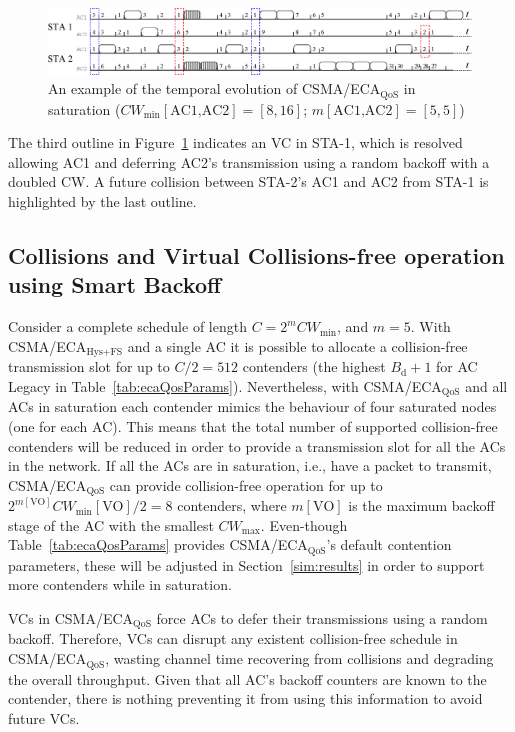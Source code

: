 	\begin{figure}[tb]
	\centering
		\includegraphics[width=0.9\linewidth]{figures/csma-eca-hew-oldScheme-fixed.eps}
		\caption{An example of the temporal evolution of CSMA/ECA$_{\text{QoS}}$ in saturation ($CW_{\min}[\text{AC1,AC2}]=[8,16]$; $m[\text{AC1,AC2}]=[5,5]$)}
		\label{fig:ecaQoS}
	\end{figure}

The third outline in Figure~\ref{fig:ecaQoS} indicates an VC in STA-1, which is resolved allowing AC1 and deferring AC2's transmission using a random backoff with a doubled CW. A future collision between STA-2's AC1 and AC2 from STA-1 is highlighted by the last outline.

\subsection{Collisions and Virtual Collisions-free operation using Smart Backoff}\label{ECAqosCollisionFree}
Consider a complete schedule of length $C=2^{m}CW_{\min}$, and $m=5$. With CSMA/ECA$_{\text{Hys+FS}}$ and a single AC it is possible to allocate a collision-free transmission slot for up to $C/2=512$ contenders (the highest $B_{\text{d}}+1$ for AC Legacy in Table~\ref{tab:ecaQosParams}). Nevertheless, with CSMA/ECA$_{\text{QoS}}$ and all ACs in saturation each contender mimics the behaviour of four saturated nodes (one for each AC). This means that the total number of supported collision-free contenders will be reduced in order to provide a transmission slot for all the ACs in the network. If all the ACs are in saturation, i.e., have a packet to transmit, CSMA/ECA$_{\text{QoS}}$ can provide collision-free operation for up to $2^{m[\text{VO}]}CW_{\min}[\text{VO}]/2=8$ contenders, where $m[\text{VO}]$ is the maximum backoff stage of the AC with the smallest $CW_{\max}$. Even-though Table~\ref{tab:ecaQosParams} provides CSMA/ECA$_{\text{QoS}}$'s default contention parameters, these will be adjusted in Section~\ref{sim:results} in order to support more contenders while in saturation.

VCs in CSMA/ECA$_{\text{QoS}}$ force ACs to defer their transmissions using a random backoff. Therefore, VCs can disrupt any existent collision-free schedule in CSMA/ECA$_{\text{QoS}}$, wasting channel time recovering from collisions and degrading the overall throughput. Given that all AC's backoff counters are known to the contender, there is nothing preventing it from using this information to avoid future VCs.

